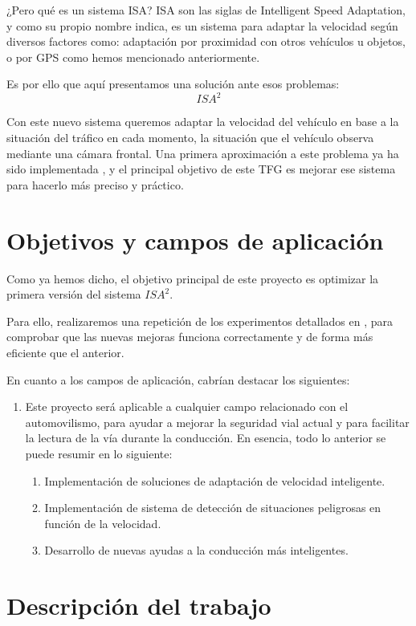 \documentclass[12pt,oneside,a4paper]{article}
\begin{document}
¿Pero qué es un sistema ISA? ISA son las siglas de Intelligent Speed Adaptation, y como su propio nombre indica, es un sistema para adaptar la velocidad según diversos factores como: adaptación por proximidad con otros vehículos u objetos, o por GPS como hemos mencionado anteriormente.

Es por ello que aquí presentamos una solución ante esos problemas: \[ISA^{2}\]

Con este nuevo sistema queremos adaptar la velocidad del vehículo en base a la situación del tráfico en cada momento, la situación que el vehículo observa mediante una cámara frontal. Una primera aproximación a este problema ya ha sido implementada \cite{isa2}, y el principal objetivo de este TFG es mejorar ese sistema para hacerlo más preciso y práctico.


\section{Objetivos y campos de aplicación}

Como ya hemos dicho, el objetivo principal de este proyecto es optimizar la primera versión del sistema $ISA^{2}$.

Para ello, realizaremos una repetición de los experimentos detallados en \cite{isa2}, para comprobar que las nuevas mejoras funciona correctamente y de forma más eficiente que el anterior.

En cuanto a los campos de aplicación, cabrían destacar los siguientes:
\begin{enumerate}
 \item Este proyecto será aplicable a cualquier campo relacionado con el automovilismo, para ayudar a mejorar la seguridad vial actual y para facilitar la lectura de la vía durante la conducción. En esencia, todo lo anterior se puede resumir en lo siguiente:
 \begin{enumerate}
 	\item Implementación de soluciones de adaptación de velocidad inteligente.
 	\item Implementación de sistema de detección de situaciones peligrosas en función de la velocidad.
 	\item Desarrollo de nuevas ayudas a la conducción más inteligentes.
 \end{enumerate}
\end{enumerate}



\section{Descripción del trabajo}
\end{document}

